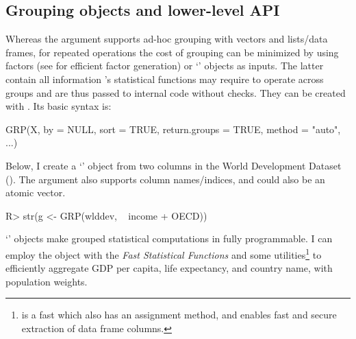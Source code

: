 \documentclass[nojss]{jss} %
\newcommand{\class}[1]{`\code{#1}'}
\newcommand{\fct}[1]{\code{#1()}}
\begin{document}
\subsection{Grouping objects and lower-level API} \label{ssec:gopt}
%
Whereas the  argument supports ad-hoc grouping with vectors and lists/data frames, for repeated operations the cost of grouping can be minimized by using factors (see  for efficient factor generation) or \class{GRP} objects as inputs. The latter contain all information 's statistical functions may require to operate across groups and are thus passed to internal  code without checks. They can be created with . Its basic syntax is:
\begin{Code}
GRP(X, by = NULL, sort = TRUE, return.groups = TRUE, method = "auto", ...)
\end{Code}
 Below, I create a \class{GRP} object from two columns in the World Development Dataset (\href{https://sebkrantz.github.io/collapse/reference/wlddev.html}{}). The  argument also supports column names/indices, and  could also be an atomic vector.
%
\begin{Schunk}
\begin{Sinput}
R> str(g <- GRP(wlddev, ~ income + OECD))
\end{Sinput}
\end{Schunk}
%
\class{GRP} objects make grouped statistical computations in  fully programmable. I can employ the object with the \emph{Fast Statistical Functions} and some utilities\footnote{\fct{add\_vars} is a fast \fct{cbind.data.frame} which also has an assignment method, and \fct{get\_vars} enables fast and secure extraction of data frame columns.} to efficiently aggregate GDP per capita, life expectancy, and country name, with population weights.
\end{document}
